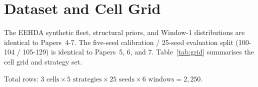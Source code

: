 \section{Dataset and Cell Grid}

The EEHDA synthetic fleet, structural priors, and Window-1 distributions
are identical to Papers~4-7. The five-seed calibration / 25-seed
evaluation split (100-104 / 105-129) is identical to Papers~5, 6, and 7.
Table~\ref{tab:grid} summarises the cell grid and strategy set.



Total rows: $3 \text{ cells} \times 5 \text{ strategies} \times 25 \text{ seeds}
\times 6 \text{ windows} = 2{,}250$.
